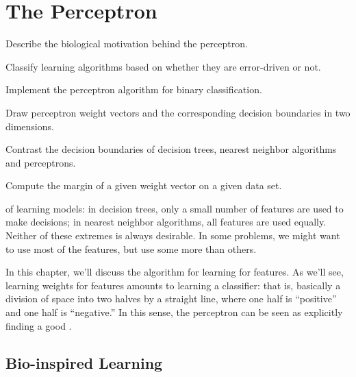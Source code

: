 \chapter{The Perceptron} \label{sec:perc}



\begin{learningobjectives}
\item Describe the biological motivation behind the perceptron.
\item Classify learning algorithms based on whether they are
  error-driven or not.
\item Implement the perceptron algorithm for binary classification.
\item Draw perceptron weight vectors and the corresponding decision
  boundaries in two dimensions.
\item Contrast the decision boundaries of decision trees, nearest
  neighbor algorithms and perceptrons.
\item Compute the margin of a given weight vector on a given data set.
\end{learningobjectives}


 of learning models: in
decision trees, only a small number of features are used to make
decisions; in nearest neighbor algorithms, all features are used
equally.  Neither of these extremes is always desirable.  In some
problems, we might want to use most of the features, but use some more
than others.

In this chapter, we'll discuss the  algorithm for
learning  for features.  As we'll see, learning
weights for features amounts to learning a 
classifier: that is, basically a division of space into two halves by
a straight line, where one half is ``positive'' and one half is
``negative.''  In this sense, the perceptron can be seen as explicitly
finding a good .

\section{Bio-inspired Learning}

